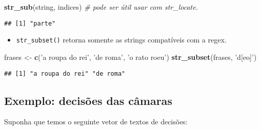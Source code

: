 \documentclass[]{book}
\newenvironment{Shaded}{\begin{snugshade}}{\end{snugshade}}
\newcommand{\KeywordTok}[1]{\textcolor[rgb]{0.13,0.29,0.53}{\textbf{{#1}}}}
\newcommand{\DataTypeTok}[1]{\textcolor[rgb]{0.13,0.29,0.53}{{#1}}}
\newcommand{\DecValTok}[1]{\textcolor[rgb]{0.00,0.00,0.81}{{#1}}}
\newcommand{\StringTok}[1]{\textcolor[rgb]{0.31,0.60,0.02}{{#1}}}
\newcommand{\CommentTok}[1]{\textcolor[rgb]{0.56,0.35,0.01}{\textit{{#1}}}}
\newcommand{\OtherTok}[1]{\textcolor[rgb]{0.56,0.35,0.01}{{#1}}}
\newcommand{\NormalTok}[1]{{#1}}
\providecommand{\tightlist}{%
  \setlength{\itemsep}{0pt}\setlength{\parskip}{0pt}}
\begin{document}
\begin{Shaded}
\begin{Highlighting}[]
\KeywordTok{str_sub}\NormalTok{(string, indices) }\CommentTok{# pode ser útil usar com str_locate.}
\end{Highlighting}
\end{Shaded}

\begin{verbatim}
## [1] "parte"
\end{verbatim}

\begin{itemize}
\tightlist
\item
  \texttt{str\_subset()} retorna somente as strings compatíveis com a
  regex.
\end{itemize}

\begin{Shaded}
\begin{Highlighting}[]
\NormalTok{frases <-}\StringTok{ }\KeywordTok{c}\NormalTok{(}\StringTok{'a roupa do rei'}\NormalTok{, }\StringTok{'de roma'}\NormalTok{, }\StringTok{'o rato roeu'}\NormalTok{)}
\KeywordTok{str_subset}\NormalTok{(frases, }\StringTok{'d[eo]'}\NormalTok{)}
\end{Highlighting}
\end{Shaded}

\begin{verbatim}
## [1] "a roupa do rei" "de roma"
\end{verbatim}

\subsection{Exemplo: decisões das
câmaras}\label{exemplo-decisoes-das-camaras}

Suponha que temos o seguinte vetor de textos de decisões:

\begin{Shaded}
\end{Shaded}
\end{document}
